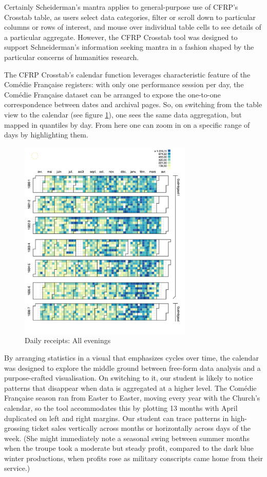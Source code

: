 \documentclass[	DIV=calc,%
							paper=a4,%
							fontsize=11pt,%
							twocolumn]{scrartcl}	 					%
\begin{document}
Certainly Scheiderman’s mantra applies to general-purpose use of CFRP’s Crosstab table, as users select data categories, filter or scroll down to particular columns or rows of interest, and mouse over individual table cells to see details of a particular aggregate.  However, the CFRP Crosstab tool was designed to support Schneiderman’s information seeking mantra in a fashion shaped by the particular concerns of humanities research.

The CFRP Crosstab’s calendar function leverages characteristic feature of the Comédie Française registers: with only one performance session per day, the Comédie Française dataset can be arranged to expose the one-to-one correspondence between dates and archival pages.  So, on switching from the table view to the calendar (see figure \ref{fig:calendar-receipts}), one sees the same data aggregation, but mapped in quantiles by day.  From here one can zoom in on a specific range of days by highlighting them.

\begin{figure}
  \centering
	\includegraphics[width=3.25in]{steps/calendar-receipts.png}
	\caption{Daily receipts: All evenings}
	\label{fig:calendar-receipts}
\end{figure}

By arranging statistics in a visual that emphasizes cycles over time, the calendar was designed to explore the middle ground between free-form data analysis and a purpose-crafted visualisation.  On switching to it, our student is likely to notice patterns that disappear when data is aggregated at a higher level.  The Comédie Française season ran from Easter to Easter, moving every year with the Church's calendar, so the tool accommodates this by plotting 13 months with April duplicated on left and right margins.  Our student can trace patterns in high-grossing ticket sales vertically across months or horizontally across days of the week.  (She might immediately note a seasonal swing between summer months when the troupe took a moderate but steady profit, compared to the dark blue winter productions, when profits rose as military conscripts came home from their service.)
\end{document}
